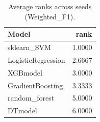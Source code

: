 \begin{table}[t]
\centering
\begin{tabular}{lr}
\toprule
Model & rank \\
\midrule
sklearn_SVM & 1.0000 \\
LogisticRegression & 2.6667 \\
XGBmodel & 3.0000 \\
GradientBoosting & 3.3333 \\
random_forest & 5.0000 \\
DTmodel & 6.0000 \\
\bottomrule
\end{tabular}
\caption{Average ranks across seeds (Weighted_F1).}
\label{tab:avg_rank_Weighted_F1}
\end{table}
